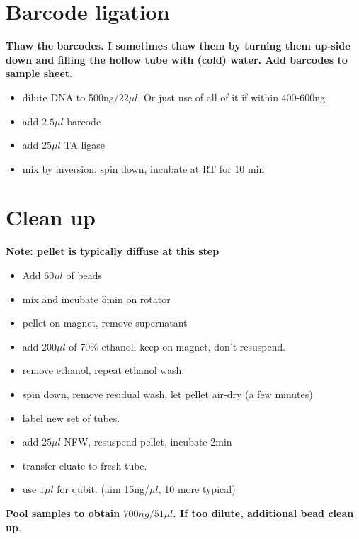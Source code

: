 \documentclass[aps,rmp]{revtex4}
\begin{document}
\section*{Barcode ligation}
{\bf Thaw the barcodes. I sometimes thaw them by turning them up-side down and filling the hollow tube with (cold) water. Add barcodes to sample sheet}.
\begin{itemize}
	\item dilute DNA to 500ng/$22\mu l$. Or just use of all of it if within 400-600ng
	\item add $2.5\mu l$ barcode
	\item add $25\mu l$ TA ligase
	\item mix by inversion, spin down, incubate at RT for 10 min
\end{itemize}

\section*{Clean up}
{\bf  Note: pellet is typically diffuse at this step}
\begin{itemize}
	\item Add $60\mu l$ of beads
	\item mix and incubate 5min on rotator
	\item pellet on magnet, remove supernatant
	\item add $200\mu l$ of 70\% ethanol. keep on magnet, don't resuspend.
	\item remove ethanol, repeat ethanol wash.
	\item spin down, remove residual wash, let pellet air-dry (a few minutes)
	\item label new set of tubes.
	\item add $25\mu l$ NFW, resuspend pellet, incubate 2min
	\item transfer eluate to fresh tube.
	\item use $1\mu l$ for qubit. (aim 15ng/$\mu l$, 10 more typical)
\end{itemize}
{\bf Pool samples to obtain $700ng/51\mu l$. If too dilute, additional bead clean up}.
\end{document}
